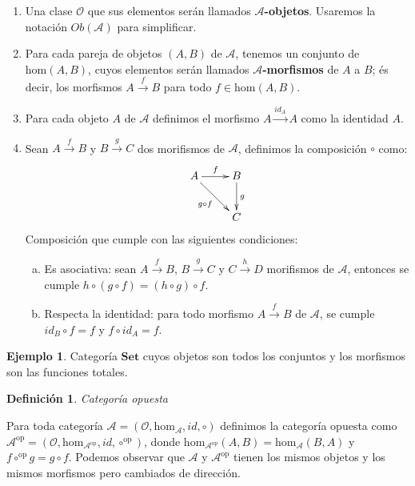 \documentclass[11pt,a4paper,openright,oneside]{article}
\numberwithin{equation}{section}
\newtheorem{defi}[teo]{Definici\'on}
\theoremstyle{definition}
\newtheorem{ex}[teo]{Ejemplo}
\begin{document}
\begin{enumerate}[(1)]
    \item Una clase $\mathcal{O}$ que sus elementos ser\'an llamados $\mathcal{A}$\textbf{-objetos}. Usaremos la notaci\'on $\mathit{Ob}(\mathcal{A})$ para simplificar.
    \item Para cada pareja de objetos $(A, B)$ de $\mathcal{A}$, tenemos un conjunto de $\text{hom}(A,B)$, cuyos elementos ser\'an llamados $\mathcal{A}$\textbf{-morfismos} de $A$ a $B$; \'es decir, los morfismos $A \overset{f}{\longrightarrow} B$ para todo $f \in \text{hom}(A,B)$.
    \item Para cada objeto $A$ de $\mathcal{A}$ definimos el morfismo $A \overset{\mathit{id}_{A}}{\longrightarrow} A$ como la identidad $A$.
    \item Sean $A \overset{f}{\longrightarrow} B$ y $B \overset{g}{\longrightarrow} C$ dos morifismos de $\mathcal{A}$, definimos la composici\'on $\circ$ como:
          $$
              \xymatrix{
                  A \ar[rd]_{g\circ f} \ar[r]^f
                  &B \ar[d]^g\\
                  &C
              }
          $$
          Composici\'on que cumple con las siguientes condiciones:

          \begin{enumerate}[(a)]
              \item Es asociativa: sean $A \overset{f}{\longrightarrow} B$, $B \overset{g}{\longrightarrow} C$ y $C \overset{h}{\longrightarrow} D$ morifismos de $\mathcal{A}$, entonces se cumple $h\circ (g\circ f) = (h\circ g)\circ f$.
              \item Respecta la identidad: para todo morfismo $A \overset{f}{\longrightarrow} B$ de $\mathcal{A}$, se cumple $\mathit{id}_B\circ f = f$ y $f\circ \mathit{id}_A = f$.
          \end{enumerate}
\end{enumerate}
\begin{ex}
    Categor\'ia $\mathbf{Set}$ cuyos objetos son todos los conjuntos y los morfismos son las funciones totales.
\end{ex}

\begin{defi}
    Categor\'ia opuesta
\end{defi}
Para toda categor\'ia $\mathcal{A} = (\mathcal{O}, \text{hom}_{\mathcal{A}}, \mathit{id}, \circ)$ definimos la categor\'ia opuesta como $\mathcal{A}^{\text{op}} = (\mathcal{O}, \text{hom}_{\mathcal{A}^{\text{op}}}, \mathit{id}, \circ^{\text{op}})$,
donde $\text{hom}_{\mathcal{A}^{\text{op}}}(A,B) = \text{hom}_{\mathcal{A}}(B,A)$ y $f\circ^{\text{op}}g = g\circ f$. Podemos observar que $\mathcal{A}$ y $\mathcal{A}^{\text{op}}$ tienen los mismos objetos y los mismos morfismos pero cambiados de direcci\'on.
\end{document}
